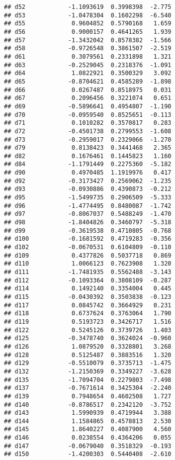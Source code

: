 \documentclass[
]{article}
\begin{document}
\begin{verbatim}
## d52            -1.1093619  0.3998398  -2.775
## d53            -1.0478304  0.1602298  -6.540
## d55             0.9604852  0.5790168   1.659
## d56             0.9000157  0.4641265   1.939
## d57            -1.3432042  0.8578382  -1.566
## d58            -0.9726548  0.3861507  -2.519
## d61             0.3079561  0.2331898   1.321
## d63            -0.2529045  0.2318376  -1.091
## d64             1.0822921  0.3500329   3.092
## d65            -0.8704621  0.4585289  -1.898
## d66             0.0267487  0.8518975   0.031
## d67             0.2096456  0.3221074   0.651
## d69            -0.5896641  0.4954807  -1.190
## d70            -0.0959540  0.8525651  -0.113
## d71             0.1010282  0.3570817   0.283
## d72            -0.4501738  0.2799553  -1.608
## d73            -0.2959017  0.2329066  -1.270
## d79             0.8138423  0.3441468   2.365
## d82             0.1676461  0.1445823   1.160
## d84            -1.1791449  0.2275360  -5.182
## d90             0.4970485  1.1919976   0.417
## d92            -0.3173427  0.2569062  -1.235
## d93            -0.0930886  0.4390873  -0.212
## d95            -1.5499735  0.2906509  -5.333
## d96            -1.4774495  0.8480087  -1.742
## d97            -0.8067037  0.5488249  -1.470
## d98            -1.8404826  0.3460797  -5.318
## d99            -0.3619538  0.4710805  -0.768
## d100           -0.1681592  0.4719283  -0.356
## d102           -0.0670531  0.6104809  -0.110
## d109            0.4377826  0.5037718   0.869
## d110            1.0066123  0.7623908   1.320
## d111           -1.7481935  0.5562488  -3.143
## d112           -0.1093364  0.3808109  -0.287
## d114            0.1492140  0.3354004   0.445
## d115           -0.0430392  0.3503838  -0.123
## d117            0.0845742  0.3664929   0.231
## d118            0.6737624  0.3763064   1.790
## d119            0.5193723  0.3426717   1.516
## d122            0.5245126  0.3739726   1.403
## d125           -0.3478740  0.3624024  -0.960
## d126            1.0879520  0.3328801   3.268
## d128            0.5125487  0.3883516   1.320
## d129           -0.5510079  0.3735713  -1.475
## d132           -1.2150369  0.3349227  -3.628
## d135           -1.7094704  0.2279803  -7.498
## d137           -0.7671614  0.3425304  -2.240
## d139            0.7948654  0.4602508   1.727
## d140           -0.8786517  0.2342120  -3.752
## d143            1.5990939  0.4719944   3.388
## d144            1.1584865  0.4578813   2.530
## d145            1.8640227  0.4087900   4.560
## d146            0.0238554  0.4364206   0.055
## d147           -0.0679040  0.3518329  -0.193
## d150           -1.4200303  0.5440408  -2.610

\end{verbatim}
\end{document}
